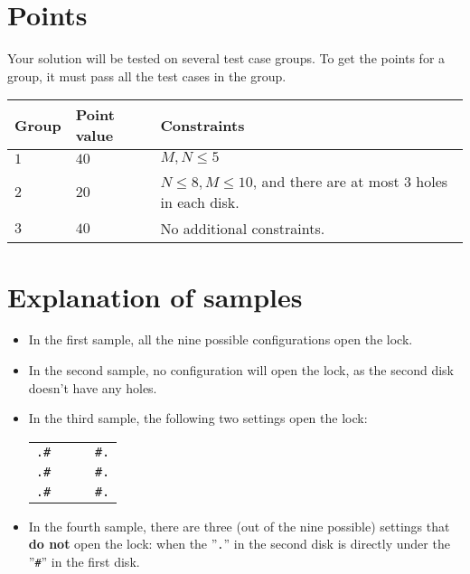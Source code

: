 \section*{Points}
Your solution will be tested on several test case groups.
To get the points for a group, it must pass all the test cases in the group.

\noindent
\begin{tabular}{| l | l | p{12cm} |}
  \hline
  \textbf{Group} & \textbf{Point value} & \textbf{Constraints} \\ \hline
  $1$    & $40$        &  $M, N \le 5$ \\ \hline 
  $2$    & $20$        &  $N \le 8, M \le 10$, and there are at most 3 holes in each disk. \\ \hline 
  $3$    & $40$        &  No additional constraints. \\ \hline
\end{tabular}



\section*{Explanation of samples}

\begin{itemize}
  \item In the first sample, all the nine possible configurations open the lock.
  
  \item In the second sample, no configuration will open the lock, as the second disk doesn't have any holes.
  
  \item In the third sample, the following two settings open the lock:

\begin{center}
  \begin{tabular}{c|c}
    {\raggedleft \texttt{.\#~~}}& {\raggedright \texttt{~~\#.}}\\
    {\raggedleft \texttt{.\#~~}}& {\raggedright \texttt{~~\#.}}\\
    {\raggedleft \texttt{.\#~~}}& {\raggedright \texttt{~~\#.}}
  \end{tabular}
\end{center}

  \item In the fourth sample, there are three (out of the nine possible) settings that \textbf{do not}
  open the lock: when the ”\texttt{.}” in the second disk is directly under the ”\texttt{\#}” in the first disk.

\end{itemize}


